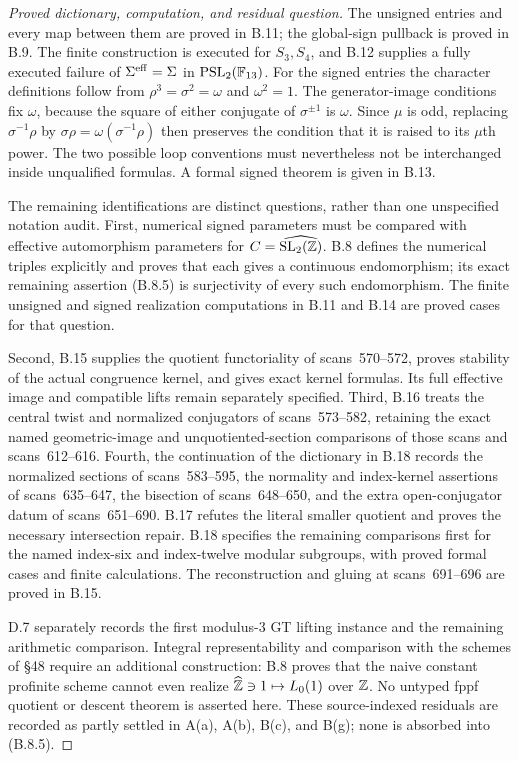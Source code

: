 \begin{proof}[Proved dictionary, computation, and residual question]
The unsigned entries and every map between them are proved in B.11;
the global-sign pullback is proved in B.9. The finite construction
is executed for $S_3,S_4$, and B.12 supplies a fully executed
failure of $\Sigma^{\rm eff}=\Sigma$ in $\mathrm{PSL}_2(\mathbb F_{13})$.
For the signed entries the character definitions follow from
$\rho^3=\sigma^2=\omega$ and $\omega^2=1$.
The generator-image conditions fix $\omega$, because the square
of either conjugate of $\sigma^{\pm1}$ is $\omega$.
Since $\mu$ is odd, replacing $\sigma^{-1}\rho$ by
$\sigma\rho=\omega(\sigma^{-1}\rho)$ then preserves the condition
that it is raised to its $\mu$th power. The two
possible loop conventions must nevertheless not be interchanged
inside unqualified formulas. A formal signed theorem is given in B.13.

The remaining identifications are distinct questions, rather than
one unspecified notation audit. First, numerical signed parameters
must be compared with effective automorphism parameters for
$C=\widehat{\operatorname{SL}_2(\mathbb Z)}$.
B.8 defines the numerical triples explicitly and proves that each
gives a continuous endomorphism; its exact remaining assertion
(B.8.5) is surjectivity of every such endomorphism.
The finite unsigned and signed realization computations in B.11
and B.14 are proved cases for that question.

Second, B.15 supplies the quotient functoriality of scans~570--572,
proves stability of the actual congruence kernel, and gives exact
kernel formulas. Its full effective image and compatible lifts
remain separately specified. Third, B.16 treats the central twist
and normalized conjugators of scans~573--582, retaining the exact
named geometric-image and unquotiented-section comparisons of those
scans and scans~612--616. Fourth, the continuation of the dictionary
in B.18 records the normalized sections of scans~583--595, the
normality and index-kernel assertions of scans~635--647, the
bisection of scans~648--650, and the extra open-conjugator datum
of scans~651--690. B.17 refutes the literal smaller quotient and
proves the necessary intersection repair. B.18 specifies the
remaining comparisons first for the named index-six and index-twelve
modular subgroups, with proved formal cases and finite calculations.
The reconstruction and gluing at scans~691--696 are proved in B.15.

D.7 separately records the first modulus-$3$ GT lifting instance
and the remaining arithmetic comparison. Integral representability and comparison
with the schemes of \S48 require an additional construction:
B.8 proves that the naive constant profinite scheme cannot even
realize $\widehat{\mathbb Z}\ni1\mapsto L_0(1)$ over $\mathbb Z$.
No untyped fppf quotient or descent theorem is asserted here.
These source-indexed residuals are recorded as partly settled in
A(a), A(b), B(c), and B(g); none is absorbed into (B.8.5).
\end{proof}

